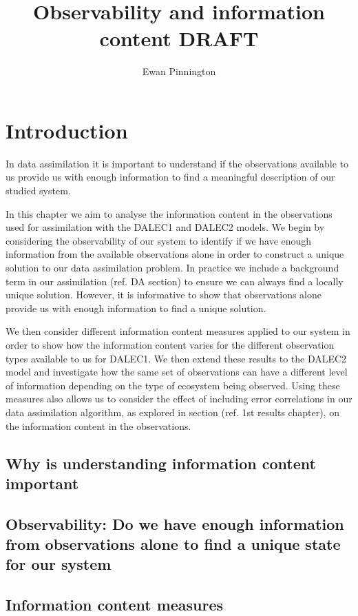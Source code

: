 \documentclass[11pt]{article}
\title{Observability and information content {\color{red}DRAFT}}
\author{Ewan Pinnington}
\begin{document}
\maketitle

\section{Introduction}
In data assimilation it is important to understand if the observations available to us provide us with enough information to find a meaningful description of our studied system. 

In this chapter we aim to analyse the information content in the observations used for assimilation with the DALEC1 and DALEC2 models. We begin by considering the observability of our system to identify if we have enough information from the available observations alone in order to construct a unique solution to our data assimilation problem. In practice we include a background term in our assimilation ({\color{red}ref. DA section}) to ensure we can always find a locally unique solution. However, it is informative to show that observations alone provide us with enough information to find a unique solution.

We then consider different information content measures applied to our system in order to show how the information content varies for the different observation types available to us for DALEC1. We then extend these results to the DALEC2 model and investigate how the same set of observations can have a different level of information depending on the type of ecosystem being observed. Using these measures also allows us to consider the effect of including error correlations in our data assimilation algorithm, as explored in section ({\color{red}ref. 1st results chapter}), on the information content in the observations.

\subsection{Why is understanding information content important}

\subsection{Observability: Do we have enough information from observations alone to find a unique state for our system}

\subsection{Information content measures}
\end{document}

